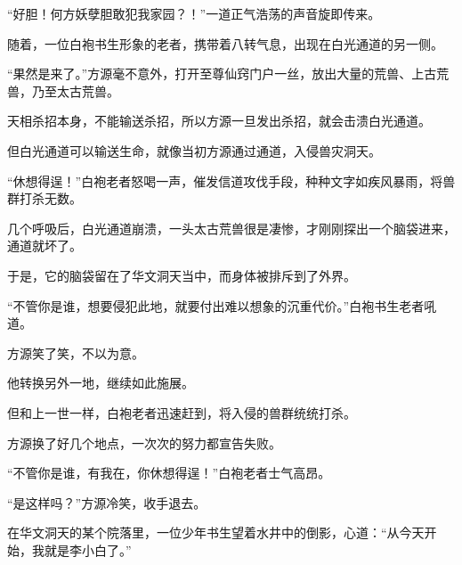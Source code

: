 \begin{this_body}
“好胆！何方妖孽胆敢犯我家园？！”一道正气浩荡的声音旋即传来。

随着，一位白袍书生形象的老者，携带着八转气息，出现在白光通道的另一侧。

“果然是来了。”方源毫不意外，打开至尊仙窍门户一丝，放出大量的荒兽、上古荒兽，乃至太古荒兽。

天相杀招本身，不能输送杀招，所以方源一旦发出杀招，就会击溃白光通道。

但白光通道可以输送生命，就像当初方源通过通道，入侵兽灾洞天。

“休想得逞！”白袍老者怒喝一声，催发信道攻伐手段，种种文字如疾风暴雨，将兽群打杀无数。

几个呼吸后，白光通道崩溃，一头太古荒兽很是凄惨，才刚刚探出一个脑袋进来，通道就坏了。

于是，它的脑袋留在了华文洞天当中，而身体被排斥到了外界。

“不管你是谁，想要侵犯此地，就要付出难以想象的沉重代价。”白袍书生老者吼道。

方源笑了笑，不以为意。

他转换另外一地，继续如此施展。

但和上一世一样，白袍老者迅速赶到，将入侵的兽群统统打杀。

方源换了好几个地点，一次次的努力都宣告失败。

“不管你是谁，有我在，你休想得逞！”白袍老者士气高昂。

“是这样吗？”方源冷笑，收手退去。

在华文洞天的某个院落里，一位少年书生望着水井中的倒影，心道：“从今天开始，我就是李小白了。”

\end{this_body}


